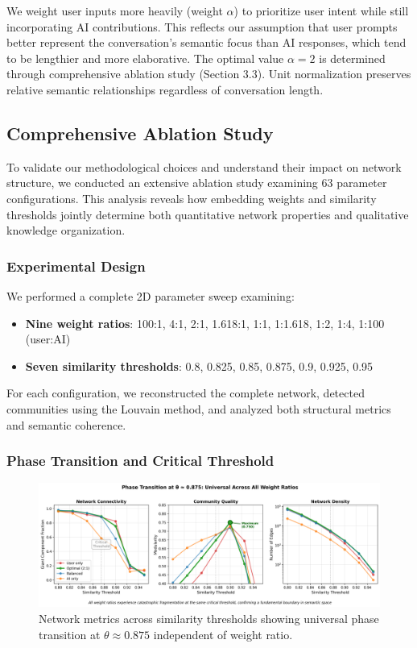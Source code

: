 \documentclass{svproc}
\begin{document}
We weight user inputs more heavily (weight $\alpha$) to prioritize user intent while still incorporating AI contributions. This reflects our assumption that user prompts better represent the conversation's semantic focus than AI responses, which tend to be lengthier and more elaborative. The optimal value $\alpha = 2$ is determined through comprehensive ablation study (Section 3.3). Unit normalization preserves relative semantic relationships regardless of conversation length.


\subsection{Comprehensive Ablation Study}

To validate our methodological choices and understand their impact on network structure, we conducted an extensive ablation study examining 63 parameter configurations. This analysis reveals how embedding weights and similarity thresholds jointly determine both quantitative network properties and qualitative knowledge organization.

\subsubsection{Experimental Design}

We performed a complete 2D parameter sweep examining:
\begin{itemize}
    \item \textbf{Nine weight ratios}: 100:1, 4:1, 2:1, 1.618:1, 1:1, 1:1.618, 1:2, 1:4, 1:100 (user:AI)
    \item \textbf{Seven similarity thresholds}: 0.8, 0.825, 0.85, 0.875, 0.9, 0.925, 0.95
\end{itemize}

For each configuration, we reconstructed the complete network, detected communities using the Louvain method, and analyzed both structural metrics and semantic coherence.

\subsubsection{Phase Transition and Critical Threshold}

\begin{figure}[h]
\centering
\includegraphics[width=\textwidth]{./images/threshold_evolution_clean.png}
\caption{Network metrics across similarity thresholds showing universal phase transition at $\theta \approx 0.875$ independent of weight ratio.}
\label{fig:phase_transition}
\end{figure}
\end{document}
